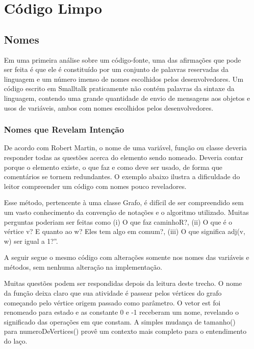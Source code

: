 \chapter{Código Limpo}
\label{chap:codigo_limpo}




\section{Nomes}
\label{sec:nomes}

Em uma primeira análise sobre um código-fonte, uma das afirmações que pode ser feita é que ele é constituído por um conjunto de palavras reservadas da linguagem e um número imenso de nomes escolhidos pelos desenvolvedores. Um código escrito em Smalltalk praticamente não contém palavras da sintaxe da linguagem, contendo uma grande quantidade de envio de mensagens aos objetos e usos de variáveis, ambos com nomes escolhidos pelos desenvolvedores.

\subsection{Nomes que Revelam Intenção}
De acordo com Robert Martin, o nome de uma variável, função ou classe deveria responder todas as questões acerca do elemento sendo nomeado. Deveria contar porque o elemento existe, o que faz e como deve ser usado, de forma que comentários se tornem redundantes. O exemplo abaixo ilustra a dificuldade do leitor compreender um código com nomes pouco reveladores.



Esse método, pertencente à uma classe Grafo, é difícil de ser compreendido sem um vasto conhecimento da convenção de notações e o algoritmo utilizado. Muitas perguntas poderiam ser feitas como (i) O que faz caminhoR?,  (ii) O que é o vértice v?  E quanto ao w? Eles tem algo em comum?, (iii)  O que significa adj(v, w) ser igual a 1?”.

A seguir segue o mesmo código com alterações somente nos nomes das variáveis e métodos, sem nenhuma alteração na implementação.



Muitas questões podem ser respondidas depois da leitura deste trecho. O nome da função deixa claro que sua atividade é passear pelos vértices do grafo começando pelo vértice origem passado como parâmetro. O vetor est foi renomeado para estado e as constante 0 e -1 receberam um nome, revelando o significado das operações em que constam. A simples mudança de tamanho() para numeroDeVertices() provê um contexto mais completo para o entendimento do laço.
	
